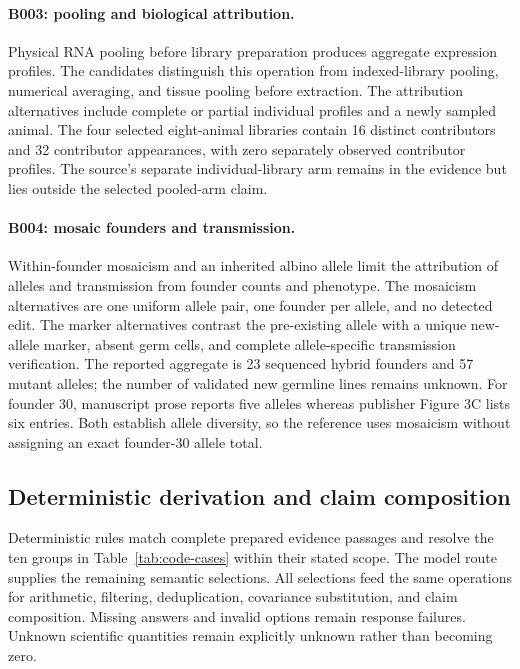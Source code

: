 \paragraph{B003: pooling and biological attribution.}
Physical RNA pooling before library preparation produces aggregate expression profiles. The candidates distinguish this operation from indexed-library pooling, numerical averaging, and tissue pooling before extraction. The attribution alternatives include complete or partial individual profiles and a newly sampled animal. The four selected eight-animal libraries contain 16 distinct contributors and 32 contributor appearances, with zero separately observed contributor profiles.
The source's separate individual-library arm remains in the evidence but lies outside the selected pooled-arm claim.

\paragraph{B004: mosaic founders and transmission.}
Within-founder mosaicism and an inherited albino allele limit the attribution of alleles and transmission from founder counts and phenotype. The mosaicism alternatives are one uniform allele pair, one founder per allele, and no detected edit. The marker alternatives contrast the pre-existing allele with a unique new-allele marker, absent germ cells, and complete allele-specific transmission verification. The reported aggregate is 23 sequenced hybrid founders and 57 mutant alleles; the number of validated new germline lines remains unknown. For founder 30, manuscript prose reports five alleles whereas publisher Figure 3C lists six entries. Both establish allele diversity, so the reference uses mosaicism without assigning an exact founder-30 allele total.

\subsection{Deterministic derivation and claim composition}

Deterministic rules match complete prepared evidence passages and resolve the ten groups in Table~\ref{tab:code-cases} within their stated scope. The model route supplies the remaining semantic selections.
All selections feed the same operations for arithmetic, filtering, deduplication, covariance substitution, and claim composition. Missing answers and invalid options remain response failures. Unknown scientific quantities remain explicitly unknown rather than becoming zero.

